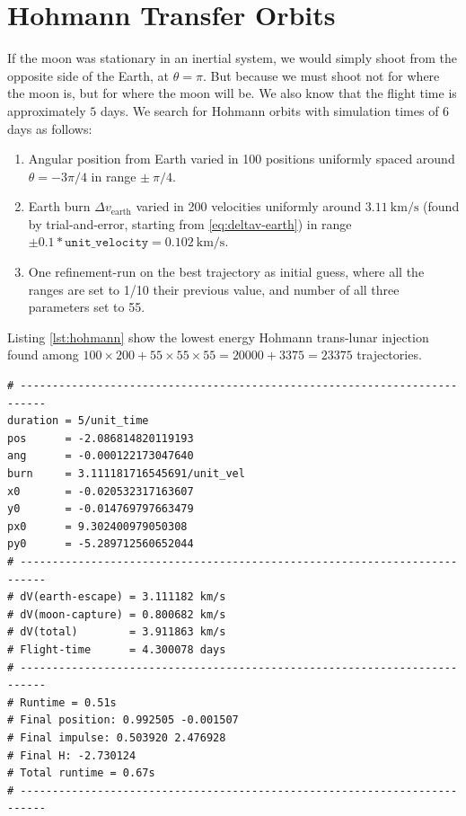 \section{Hohmann Transfer Orbits}
If the moon was stationary in an inertial system, we would simply shoot from the opposite side of the Earth, at $\theta = \pi$. But because we must shoot not for where the moon is, but for where the moon will be. We also know that the flight time is approximately $5$ days. We search for Hohmann orbits with simulation times of 6 days as follows:
\begin{enumerate}
    \item Angular position from Earth varied in 100 positions uniformly spaced around $\theta=-3\pi/4$ in range $\pm\ \pi/4.$
    \item Earth burn $\Delta v_{\text{earth}}$ varied in 200 velocities uniformly around $\SI{3.11}{\km\per\s}$ (found by trial-and-error, starting from \ref{eq:deltav-earth}) in range $\pm 0.1*\texttt{unit\_velocity} = \SI{0.102}{\km\per\s}.$
    \item One refinement-run on the best trajectory as initial guess, where all the ranges are set to 1/10 their previous value, and number of all three parameters set to 55.
\end{enumerate}

Listing \ref{lst:hohmann} show the lowest energy Hohmann trans-lunar injection found among $100 \times 200 + 55 \times 55 \times 55  = 20000 + 3375 = 23375$ trajectories.

\begin{adjustwidth*}{0cm}{-0.4cm}
\begin{lstlisting}[caption={Best Hohmann orbit. \texttt{pos} = angular difference with start angle (here $\theta=-3\pi/4$), \texttt{ang} = angle to velocity vector in Earth parking orbit, \texttt{burn} = $\Delta v_{\text{earth}}$, \texttt{(x0,y0,px0,py0)} are the initial conditions.},label=lst:hohmann]
# --------------------------------------------------------------------------
duration = 5/unit_time
pos      = -2.086814820119193
ang      = -0.000122173047640
burn     = 3.111181716545691/unit_vel
x0       = -0.020532317163607
y0       = -0.014769797663479
px0      = 9.302400979050308
py0      = -5.289712560652044
# --------------------------------------------------------------------------
# dV(earth-escape) = 3.111182 km/s
# dV(moon-capture) = 0.800682 km/s
# dV(total)        = 3.911863 km/s
# Flight-time      = 4.300078 days
# --------------------------------------------------------------------------
# Runtime = 0.51s
# Final position: 0.992505 -0.001507
# Final impulse: 0.503920 2.476928
# Final H: -2.730124
# Total runtime = 0.67s
# --------------------------------------------------------------------------
\end{lstlisting}
\end{adjustwidth*}

